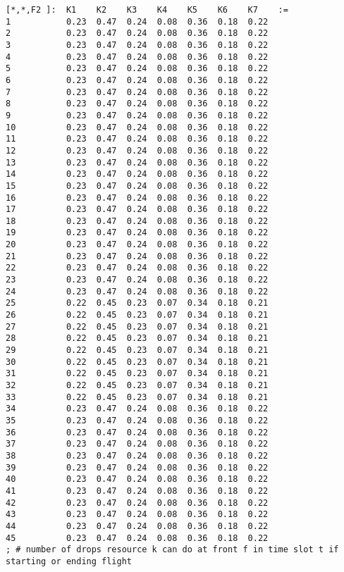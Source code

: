 \begin{lstlisting}
[*,*,F2 ]:  K1    K2    K3    K4    K5    K6    K7    :=
1           0.23  0.47  0.24  0.08  0.36  0.18  0.22
2           0.23  0.47  0.24  0.08  0.36  0.18  0.22
3           0.23  0.47  0.24  0.08  0.36  0.18  0.22
4           0.23  0.47  0.24  0.08  0.36  0.18  0.22
5           0.23  0.47  0.24  0.08  0.36  0.18  0.22
6           0.23  0.47  0.24  0.08  0.36  0.18  0.22
7           0.23  0.47  0.24  0.08  0.36  0.18  0.22
8           0.23  0.47  0.24  0.08  0.36  0.18  0.22
9           0.23  0.47  0.24  0.08  0.36  0.18  0.22
10          0.23  0.47  0.24  0.08  0.36  0.18  0.22
11          0.23  0.47  0.24  0.08  0.36  0.18  0.22
12          0.23  0.47  0.24  0.08  0.36  0.18  0.22
13          0.23  0.47  0.24  0.08  0.36  0.18  0.22
14          0.23  0.47  0.24  0.08  0.36  0.18  0.22
15          0.23  0.47  0.24  0.08  0.36  0.18  0.22
16          0.23  0.47  0.24  0.08  0.36  0.18  0.22
17          0.23  0.47  0.24  0.08  0.36  0.18  0.22
18          0.23  0.47  0.24  0.08  0.36  0.18  0.22
19          0.23  0.47  0.24  0.08  0.36  0.18  0.22
20          0.23  0.47  0.24  0.08  0.36  0.18  0.22
21          0.23  0.47  0.24  0.08  0.36  0.18  0.22
22          0.23  0.47  0.24  0.08  0.36  0.18  0.22
23          0.23  0.47  0.24  0.08  0.36  0.18  0.22
24          0.23  0.47  0.24  0.08  0.36  0.18  0.22
25          0.22  0.45  0.23  0.07  0.34  0.18  0.21
26          0.22  0.45  0.23  0.07  0.34  0.18  0.21
27          0.22  0.45  0.23  0.07  0.34  0.18  0.21
28          0.22  0.45  0.23  0.07  0.34  0.18  0.21
29          0.22  0.45  0.23  0.07  0.34  0.18  0.21
30          0.22  0.45  0.23  0.07  0.34  0.18  0.21
31          0.22  0.45  0.23  0.07  0.34  0.18  0.21
32          0.22  0.45  0.23  0.07  0.34  0.18  0.21
33          0.22  0.45  0.23  0.07  0.34  0.18  0.21
34          0.23  0.47  0.24  0.08  0.36  0.18  0.22
35          0.23  0.47  0.24  0.08  0.36  0.18  0.22
36          0.23  0.47  0.24  0.08  0.36  0.18  0.22
37          0.23  0.47  0.24  0.08  0.36  0.18  0.22
38          0.23  0.47  0.24  0.08  0.36  0.18  0.22
39          0.23  0.47  0.24  0.08  0.36  0.18  0.22
40          0.23  0.47  0.24  0.08  0.36  0.18  0.22
41          0.23  0.47  0.24  0.08  0.36  0.18  0.22
42          0.23  0.47  0.24  0.08  0.36  0.18  0.22
43          0.23  0.47  0.24  0.08  0.36  0.18  0.22
44          0.23  0.47  0.24  0.08  0.36  0.18  0.22
45          0.23  0.47  0.24  0.08  0.36  0.18  0.22
; # number of drops resource k can do at front f in time slot t if starting or ending flight


\end{lstlisting}
